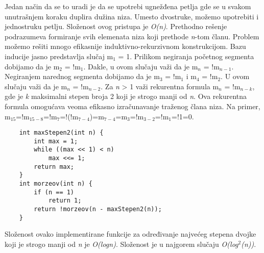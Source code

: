 \documentclass{article}
\begin{document}
Jedan način da se to uradi je da se upotrebi ugnežđena petlja gde se u svakom
unutrašnjem koraku duplira dužina niza. Umesto dvostruke, možemo upotrebiti i jednostruku petlju. Složenost ovog pristupa je \textit{O(n)}. Prethodno rešenje podrazumeva formiranje svih elemenata niza koji
prethode \textit{n}-tom članu.
\newline Problem možemo rešiti mnogo efikasnije induktivno-rekurzivnom konstrukcijom. Bazu inducije jasno predstavlja slučaj m$_1$ = 1.
Prilikom negiranja početnog segmenta dobijamo da je m$_2$ = !m$_1$. Dakle, u ovom
slučaju važi da je m$_n$ = !m$_{n-1}$. Negiranjem narednog segmenta dobijamo da
je m$_3$ = !m$_1$ i m$_4$ = !m$_2$. U ovom slučaju važi da je m$_n$ = !m$_{n-2}$. Za \textit{n} > 1 važi rekurentna formula m$_n$ = !m$_{n-k}$, gde je \textit{k} maksimalni
stepen broja 2 koji je strogo manji od \textit{n}. Ova rekurentna formula omogućava
veoma efikasno izračunavanje traženog člana niza. Na primer,
m$_{15}$=!m$_{15-8}$=!m$_{7}$=!(!m$_{7-4}$)=m$_{7-4}$=m$_{3}$=!m$_{3-2}$=!m$_{1}$=!1=0.
\begin{lstlisting}
    int maxStepen2(int n) {
        int max = 1;
        while ((max << 1) < n)
            max <<= 1;
        return max;
    }
    int morzeov(int n) {
        if (n == 1)
            return 1;
        return !morzeov(n - maxStepen2(n));
    }
\end{lstlisting}
Složenost ovako implementirane funkcije za određivanje najvećeg stepena dvojke
koji je strogo manji od \textit{n} je \textit{O(logn)}. Složenost
je u najgorem slučaju \textit{O(log$^2$(n))}.
\end{document}
